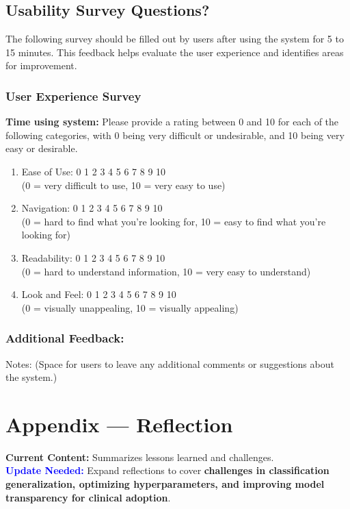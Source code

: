 \documentclass[12pt, titlepage]{article}
\begin{document}
\subsection{Usability Survey Questions?}

The following survey should be filled out by users after using the system for 5 to 15 minutes. This feedback helps evaluate the user experience and identifies areas for improvement.

\subsubsection{User Experience Survey}

\textbf{Time using system:}
Please provide a rating between 0 and 10 for each of the following categories, with 0 being very difficult or undesirable, and 10 being very easy or desirable.
\begin{enumerate}
  \item Ease of Use: 0 1 2 3 4 5 6 7 8 9 10 \\
    (0 = very difficult to use, 10 = very easy to use)
  \item Navigation: 0 1 2 3 4 5 6 7 8 9 10 \\
    (0 = hard to find what you’re looking for, 10 = easy to find what you’re looking for)
  \item Readability: 0 1 2 3 4 5 6 7 8 9 10 \\
    (0 = hard to understand information, 10 = very easy to understand)
  \item Look and Feel: 0 1 2 3 4 5 6 7 8 9 10 \\
    (0 = visually unappealing, 10 = visually appealing)
\end{enumerate}

\subsubsection{Additional Feedback:}
Notes: (Space for users to leave any additional comments or suggestions about the system.)

\newpage{}
\section*{Appendix --- Reflection}

\textbf{Current Content:} Summarizes lessons learned and challenges. \\
\textbf{\textcolor{blue}{Update Needed:}} Expand reflections to cover \textbf{challenges in classification generalization, optimizing hyperparameters, and improving model transparency for clinical adoption}.
\end{document}
